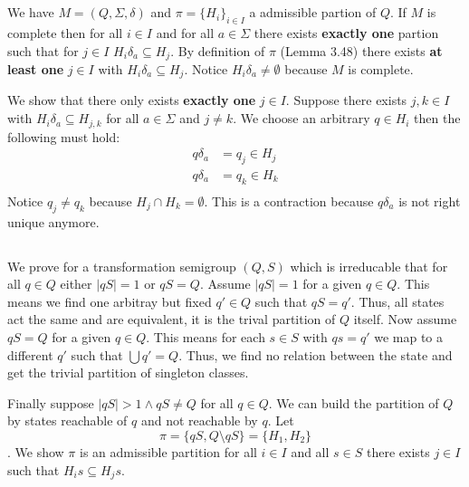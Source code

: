 \documentclass[a4paper,12pt,numbers=noenddot]{scrreport}
\begin{document}

\setcounter{chapter}{4}
\chapter{}
\section{}
We have $M = (Q, \Sigma, \delta)$ and $\pi = \{H_i\}_{i \in I}$ a admissible partion of $Q$.
If $M$ is complete then for all $i \in I$ and for all $a \in \Sigma$ there exists \textbf{exactly one} partion such that for $j \in I$ $H_i\delta_a \subseteq H_j$.
By definition of $\pi$ (Lemma 3.48) there exists \textbf{at least one} $j \in I$ with $H_i\delta_a \subseteq H_j$.
Notice $H_i\delta_a \neq \emptyset$ because $M$ is complete.

We show that there only exists \textbf{exactly one} $j \in I$.
Suppose there exists $j,k \in I$ with $H_i\delta_a \subseteq H_{j,k}$ for all $a \in \Sigma$ and $j \neq k$.
We choose an arbitrary $q \in H_i$ then the following must hold:
\begin{align*}
    q\delta_a &= q_j \in H_j \\
    q\delta_a &= q_k \in H_k \\
\end{align*}
Notice $q_j \neq q_k$ because $H_j \cap H_k = \emptyset$.
This is a contraction because $q\delta_a$ is not right unique anymore.

\section{}
We prove for a transformation semigroup  $(Q,S)$ which is irreducable that for all $q \in Q$ either $|qS| = 1$  or $qS = Q$.
Assume $|qS| = 1$ for a given $q \in Q$. This means we find one arbitray but fixed $q' \in Q$ such that $qS = q'$.
Thus, all states act the same and are equivalent, it is the trival partition of $Q$ itself.
Now assume $qS = Q$ for a given $q \in Q$. This means for each $s \in S$ with $qs = q'$ we map to a different $q'$ such that $\bigcup q' = Q$.
Thus, we find no relation between the state and get the trivial partition of singleton classes.

Finally suppose $|qS| > 1 \land qS \neq Q$ for all $q \in Q$.
We can build the partition of $Q$ by states reachable of $q$ and not reachable by $q$.
Let $$\pi = \{qS, Q \setminus qS\} = \{H_1, H_2\}$$.
We show $\pi$ is an admissible partition for all $i \in I$ and all $s \in S$ there exists $j \in I$ such that $H_is \subseteq H_js$.
\end{document}

